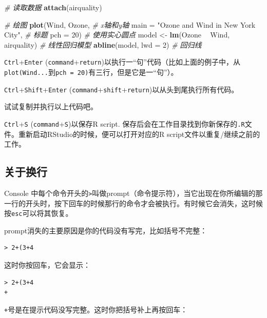 \documentclass[]{book}
\newenvironment{Shaded}{\begin{snugshade}}{\end{snugshade}}
\newcommand{\CommentTok}[1]{\textcolor[rgb]{0.56,0.35,0.01}{\textit{#1}}}
\newcommand{\DataTypeTok}[1]{\textcolor[rgb]{0.13,0.29,0.53}{#1}}
\newcommand{\DecValTok}[1]{\textcolor[rgb]{0.00,0.00,0.81}{#1}}
\newcommand{\KeywordTok}[1]{\textcolor[rgb]{0.13,0.29,0.53}{\textbf{#1}}}
\newcommand{\NormalTok}[1]{#1}
\newcommand{\OperatorTok}[1]{\textcolor[rgb]{0.81,0.36,0.00}{\textbf{#1}}}
\newcommand{\StringTok}[1]{\textcolor[rgb]{0.31,0.60,0.02}{#1}}
\begin{document}
\begin{Shaded}
\begin{Highlighting}[]
\CommentTok{# 读取数据}
\KeywordTok{attach}\NormalTok{(airquality)}

\CommentTok{# 绘图}
\KeywordTok{plot}\NormalTok{(Wind, Ozone, }\CommentTok{# x轴和y轴}
     \DataTypeTok{main =} \StringTok{"Ozone and Wind in New York City"}\NormalTok{, }\CommentTok{# 标题}
     \DataTypeTok{pch =} \DecValTok{20}\NormalTok{) }\CommentTok{# 使用实心圆点}
\NormalTok{model <-}\StringTok{ }\KeywordTok{lm}\NormalTok{(Ozone }\OperatorTok{~}\StringTok{ }\NormalTok{Wind, airquality) }\CommentTok{# 线性回归模型}
\KeywordTok{abline}\NormalTok{(model, }\DataTypeTok{lwd =} \DecValTok{2}\NormalTok{) }\CommentTok{# 回归线}
\end{Highlighting}
\end{Shaded}

\texttt{Ctrl}+\texttt{Enter} (\texttt{command}+\texttt{return})以执行一``句''代码（比如上面的例子中，从\texttt{plot(Wind...}到\texttt{pch\ =\ 20)}有三行，但是它是一``句''）。

\texttt{Ctrl}+\texttt{Shift}+\texttt{Enter} (\texttt{command}+\texttt{shift}+\texttt{return})以从头到尾执行所有代码。

试试复制并执行以上代码吧。

\texttt{Ctrl}+\texttt{S} (\texttt{command}+\texttt{S})以保存R script. 保存后会在工作目录找到你新保存的\texttt{.R}文件。重新启动RStudio的时候，便可以打开对应的R script文件以重复/继续之前的工作。

\subsection{关于换行}

Console 中每个命令开头的\texttt{\textgreater{}}叫做prompt（命令提示符），当它出现在你所编辑的那一行的开头时，按下回车的时候那行的命令才会被执行。有时候它会消失，这时候按\texttt{esc}可以将其恢复。

prompt消失的主要原因是你的代码没有写完，比如括号不完整：

\begin{verbatim}
> 2+(3+4
\end{verbatim}

这时你按回车，它会显示：

\begin{verbatim}
> 2+(3+4
+
\end{verbatim}

\texttt{+}号是在提示代码没写完整。这时你把括号补上再按回车：
\end{document}
